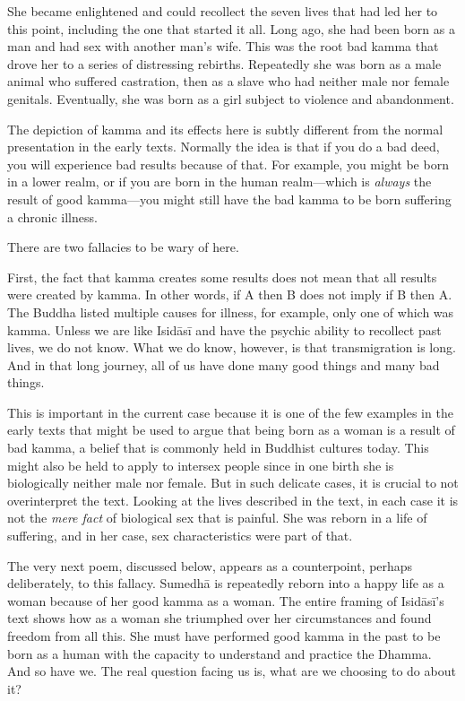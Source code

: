 \documentclass[12pt,openany]{book}%
\begin{document}
She became enlightened and could recollect the seven lives that had led her to this point, including the one that started it all. Long ago, she had been born as a man and had sex with another man’s wife. This was the root bad kamma that drove her to a series of distressing rebirths. Repeatedly she was born as a male animal who suffered castration, then as a slave who had neither male nor female genitals. Eventually, she was born as a girl subject to violence and abandonment.

The depiction of kamma and its effects here is subtly different from the normal presentation in the early texts. Normally the idea is that if you do a bad deed, you will experience bad results because of that. For example, you might be born in a lower realm, or if you are born in the human realm—which is \emph{always} the result of good kamma—you might still have the bad kamma to be born suffering a chronic illness.

There are two fallacies to be wary of here.

First, the fact that kamma creates some results does not mean that all results were created by kamma. In other words, if A then B does not imply if B then A. The Buddha listed multiple causes for illness, for example, only one of which was kamma. Unless we are like \textsanskrit{Isidāsī} and have the psychic ability to recollect past lives, we do not know. What we do know, however, is that transmigration is long. And in that long journey, all of us have done many good things and many bad things.

This is important in the current case because it is one of the few examples in the early texts that might be used to argue that being born as a woman is a result of bad kamma, a belief that is commonly held in Buddhist cultures today. This might also be held to apply to intersex people since in one birth she is biologically neither male nor female. But in such delicate cases, it is crucial to not overinterpret the text. Looking at the lives described in the text, in each case it is not the \emph{mere fact} of biological sex that is painful. She was reborn in a life of suffering, and in her case, sex characteristics were part of that.

The very next poem, discussed below, appears as a counterpoint, perhaps deliberately, to this fallacy. \textsanskrit{Sumedhā} is repeatedly reborn into a happy life as a woman because of her good kamma as a woman. The entire framing of \textsanskrit{Isidāsī}’s text shows how as a woman she triumphed over her circumstances and found freedom from all this. She must have performed good kamma in the past to be born as a human with the capacity to understand and practice the Dhamma. And so have we. The real question facing us is, what are we choosing to do about it?
\end{document}
